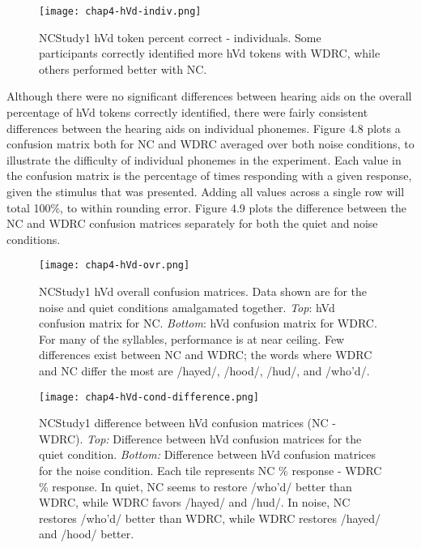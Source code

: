 \begin{figure}[htp]
\begin{center}
\texttt{[image: chap4-hVd-indiv.png]} \\
\caption[NCStudy1 hVd token percent correct - individuals]{NCStudy1 hVd token percent correct - individuals.  Some participants correctly identified more hVd tokens with WDRC, while others performed better with NC.}
\label{ch4-hVd-indiv}
\end{center}
\end{figure}

Although there were no significant differences between hearing aids on the overall percentage of hVd tokens correctly identified, there were fairly consistent differences between the hearing aids on individual phonemes.  Figure 4.8 plots a confusion matrix both for NC and WDRC averaged over both noise conditions, to illustrate the difficulty of individual phonemes in the experiment.  Each value in the confusion matrix is the percentage of times responding with a given response, given the stimulus that was presented.  Adding all values across a single row will total 100\%, to within rounding error.  Figure 4.9 plots the difference between the NC and WDRC confusion matrices separately for both the quiet and noise conditions.

\begin{figure}[htp]
\begin{center}
\texttt{[image: chap4-hVd-ovr.png]} \\
\caption[NCStudy1 hVd overall confusion matrices]{NCStudy1 hVd overall confusion matrices.  Data shown are for the noise and quiet conditions amalgamated together.  \emph{Top}: hVd confusion matrix for NC.  \emph{Bottom}: hVd confusion matrix for WDRC.  For many of the syllables, performance is at near ceiling.  Few differences exist between NC and WDRC; the words where WDRC and NC differ the most are /hayed/, /hood/, /hud/, and /who'd/. }
\label{ch4-hVd-ovr}
\end{center}
\end{figure}

\begin{figure}[htp]
\begin{center}
\texttt{[image: chap4-hVd-cond-difference.png]} \\
\caption[NCStudy1 difference between hVd confusion matrices (NC - WDRC)]{NCStudy1 difference between hVd confusion matrices (NC - WDRC).  \emph{Top:} Difference between hVd confusion matrices for the quiet condition.  \emph{Bottom:} Difference between hVd confusion matrices for the noise condition.  Each tile represents NC \% response - WDRC \% response.  In quiet, NC seems to restore /who'd/ better than WDRC, while WDRC favors /hayed/ and /hud/.  In noise, NC restores /who'd/ better than WDRC, while WDRC restores /hayed/ and /hood/ better.}
\label{ch4-hVd-cond-diff}
\end{center}
\end{figure}

